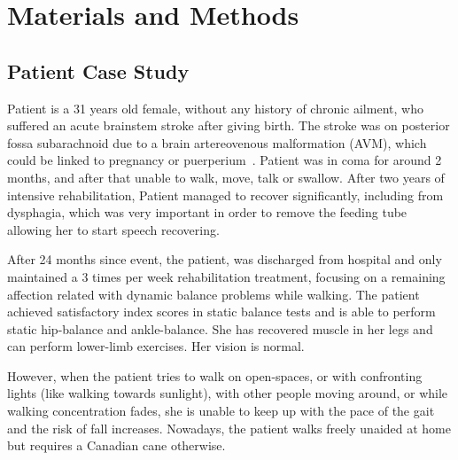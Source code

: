 \documentclass[conference]{IEEEtran}
\begin{document}
\section{Materials and Methods}

\subsection{Patient Case Study}
\label{sec:case-study}

Patient is a 31 years old female, without any history of chronic ailment, who suffered an acute brainstem stroke after giving birth.  The stroke was on posterior fossa subarachnoid due to a brain artereovenous malformation (AVM), which could be linked to pregnancy or puerperium~\cite{Porras.etal2017}.  Patient was in coma for around 2 months, and after that unable to walk, move, talk or swallow.  After two years of intensive rehabilitation, Patient managed to recover significantly, including from dysphagia, which was very important in order to remove the feeding tube allowing her to start speech recovering.  

After 24 months since event, the patient, was discharged from hospital and only maintained a 3 times per week rehabilitation treatment, focusing on a remaining affection related with dynamic balance problems while walking.  The patient achieved satisfactory index scores in static balance tests and is able to perform static hip-balance and ankle-balance.  She has recovered muscle in her legs and can perform lower-limb exercises.  Her vision is normal.   

However, when the patient tries to walk on open-spaces, or with confronting lights (like walking towards sunlight), with other people moving around, or while walking concentration fades, she is unable to keep up with the pace of the gait and the risk of fall increases.  Nowadays, the patient walks freely unaided at home but requires a Canadian cane otherwise.
\end{document}
